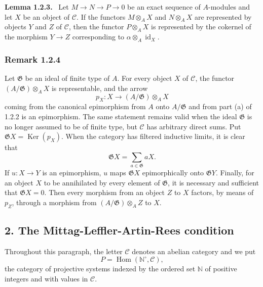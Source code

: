 \documentclass[11pt]{article}
\providecommand{\NN}{\mathbb{N}}
\newenvironment{statement}[1]{\par\medskip\noindent\textbf{#1.}\ }{\par\medskip}
\DeclareMathOperator{\Hom}{Hom}
\providecommand{\Ker}{\operatorname{Ker}}
\providecommand{\id}{\operatorname{id}}
\providecommand{\Hom}{\operatorname{Hom}}
\providecommand{\NN}{\mathbb N}
\providecommand{\cC}{\mathcal C}
\providecommand{\cG}{\mathfrak G}
\providecommand{\id}{\operatorname{id}}
\providecommand{\Ker}{\operatorname{Ker}}
\providecommand{\Ker}{\operatorname{Ker}}
\providecommand{\id}{\operatorname{id}}
\providecommand{\id}{\operatorname{id}}
\providecommand{\id}{\operatorname{id}}
\providecommand{\cC}{\mathcal C}
\begin{document}
\begin{statement}{Lemma 1.2.3}
Let $M\to N\to P\to0$ be an exact sequence of $A$-modules and let $X$ be an object of $\cC$. If the functors $M\otimes_A X$ and $N\otimes_A X$ are represented by objects $Y$ and $Z$ of $\cC$, then the functor $P\otimes_A X$ is represented by the cokernel of the morphism $Y\to Z$ corresponding to $\alpha\otimes_A\id_X$.
\end{statement}

\subsubsection*{Remark 1.2.4}
Let $\cG$ be an ideal of finite type of $A$. For every object $X$ of $\cC$, the functor $(A/\cG)\otimes_A X$ is representable, and the arrow
\[
p_X:X\longrightarrow (A/\cG)\otimes_A X
\]
coming from the canonical epimorphism from $A$ onto $A/\cG$ and from part (a) of 1.2.2 is an epimorphism. The same statement remains valid when the ideal $\cG$ is no longer assumed to be of finite type, but $\cC$ has arbitrary direct sums. Put $\cG X=\Ker(p_X)$. When the category has filtered inductive limits, it is clear that
\[
\cG X=\sum_{a\in\cG}aX.
\]
If $u:X\to Y$ is an epimorphism, $u$ maps $\cG X$ epimorphically onto $\cG Y$. Finally, for an object $X$ to be annihilated by every element of $\cG$, it is necessary and sufficient that $\cG X=0$. Then every morphism from an object $Z$ to $X$ factors, by means of $p_Z$, through a morphism from $(A/\cG)\otimes_A Z$ to $X$.

\subsection*{2. The Mittag-Leffler-Artin-Rees condition}
Throughout this paragraph, the letter $\cC$ denotes an abelian category and we put
\[
P=\Hom(\NN^\circ,\cC),
\]
the category of projective systems indexed by the ordered set $\NN$ of positive integers and with values in $\cC$.
\end{document}
